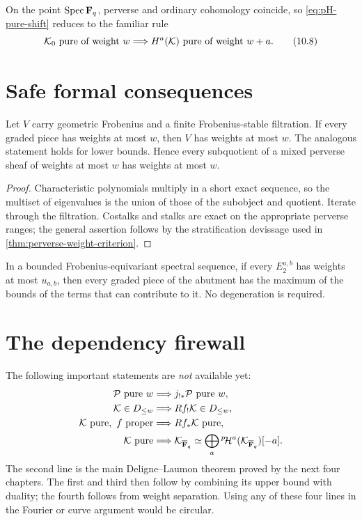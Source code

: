 On the point \(\operatorname{Spec}\mathbf F_q\), perverse and ordinary cohomology coincide, so
\eqref{eq:pH-pure-shift} reduces to the familiar rule
\[
  \mathcal K_0\text{ pure of weight }w
  \Longrightarrow H^a(\mathcal K)\text{ pure of weight }w+a.
\tag{10.8}\label{eq:point-weight-shift}
\]

\section{Safe formal consequences}

\begin{lemma}
\label{lem:weight-filtration-subquotients}
Let \(V\) carry geometric Frobenius and a finite Frobenius-stable filtration.
If every graded piece has weights at most \(w\), then \(V\) has weights at
most \(w\).  The analogous statement holds for lower bounds.  Hence every
subquotient of a mixed perverse sheaf of weights at most \(w\) has weights at
most \(w\).
\end{lemma}

\begin{proof}
Characteristic polynomials multiply in a short exact sequence, so the
multiset of eigenvalues is the union of those of the subobject and quotient.
Iterate through the filtration.  Costalks and stalks are exact on the
appropriate perverse ranges; the general assertion follows by the
stratification devissage used in \cref{thm:perverse-weight-criterion}.
\end{proof}

\begin{corollary}
\label{cor:perverse-weight-spectral-rule}
In a bounded Frobenius-equivariant spectral sequence, if every \(E_2^{a,b}\)
has weights at most \(u_{a,b}\), then every graded piece of the abutment has
the maximum of the bounds of the terms that can contribute to it.  No
degeneration is required.
\end{corollary}

\section{The dependency firewall}

The following important statements are \emph{not} available yet:
\begin{align*}
 \mathcal P\text{ pure }w
 &\Longrightarrow j_{!*}\mathcal P\text{ pure }w,\\
 \mathcal K\in D_{\leq w}
 &\Longrightarrow Rf_!\mathcal K\in D_{\leq w},\\
 \mathcal K\text{ pure},\ f\text{ proper}
 &\Longrightarrow Rf_*\mathcal K\text{ pure},\\
 \mathcal K\text{ pure}
 &\Longrightarrow
   \mathcal K_{\overline{\mathbf F}_q}\simeq\bigoplus_a{}^{p}\!\mathcal H^a(\mathcal K_{\overline{\mathbf F}_q})[-a].
\end{align*}
The second line is the main Deligne--Laumon theorem proved by the next four
chapters.  The first and third then follow by combining its upper bound with
duality; the fourth follows from weight separation.  Using any of these four
lines in the Fourier or curve argument would be circular.

